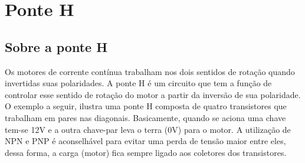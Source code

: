\section{Ponte H}

\subsection{Sobre a ponte H}

Os motores de corrente contínua trabalham nos dois sentidos de rotação quando invertidas suas polaridades. A ponte H é um circuito que tem a função de controlar esse sentido de rotação do motor a partir da inversão de sua polaridade. O exemplo a seguir, ilustra uma ponte H composta de quatro transistores que trabalham em pares nas diagonais. Basicamente, quando se aciona uma chave tem-se 12V e a outra chave-par leva o terra (0V) para o motor. A utilização de  NPN e PNP é aconselhável para evitar uma perda de tensão maior entre eles, dessa forma, a carga (motor) fica sempre ligado aos coletores dos transistores.